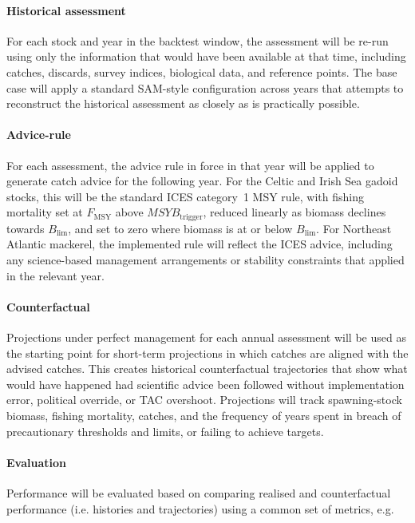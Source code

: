 \documentclass[11pt,a4paper]{extarticle}
\begin{document}
	\paragraph{Historical assessment}
	For each stock and year in the backtest window, the assessment will be re-run using only the information that would have been available at that time, including catches, discards, survey indices, biological data, and reference points. The base case will apply a standard SAM-style configuration across years that attempts to reconstruct the historical assessment as closely as is practically possible.
	
	\paragraph{Advice-rule}
	For each assessment, the advice rule in force in that year will be applied to generate catch advice for the following year. For the Celtic and Irish Sea gadoid stocks, this will be the standard ICES category~1 MSY rule, with fishing mortality set at \(F_{\mathrm{MSY}}\) above \(MSYB_{\mathrm{trigger}}\), reduced linearly as biomass declines towards \(B_{\lim}\), and set to zero where biomass is at or below \(B_{\lim}\). For Northeast Atlantic mackerel, the implemented rule will reflect the ICES advice, including any science-based management arrangements or stability constraints that applied in the relevant year.
	
	\paragraph{Counterfactual}
	Projections under perfect management for each annual assessment will be used as the starting point for short-term projections in which catches are aligned with the advised catches. This creates historical counterfactual trajectories that show what would have happened had scientific advice been followed without implementation error, political override, or TAC overshoot. Projections will track spawning-stock biomass, fishing mortality, catches, and the frequency of years spent in breach of precautionary thresholds and limits, or failing to achieve targets.
	
	\paragraph{Evaluation}
	Performance will be evaluated based on comparing realised and counterfactual performance (i.e. histories and trajectories) using a common set of metrics, e.g.
	
\end{document}
